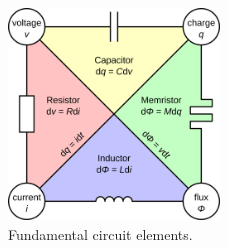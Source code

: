 \documentclass[12pt, a4paper]{article}
\begin{document}
%

\begin{figure}[htbp]
	\begin{center}
		\includegraphics[width=0.5\textwidth]{inc/circuit_elements.png}
		\caption{Fundamental circuit elements.\protect\footnotemark}
		\label{fig:circuit_elements}
	\end{center}
\end{figure}
\end{document}
